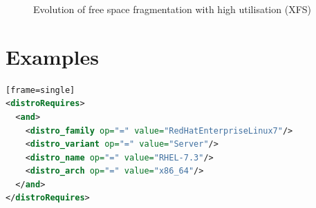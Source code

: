 \documentclass[
  color, %
  table, %
  lof,   %
  lot,   %
]{fithesis3}
\begin{document}
\begin{figure}[htb]
    \centering
    \caption{Evolution of free space fragmentation with high utilisation (XFS)}
    \label{fig:free99}
\end{figure}




\chapter{Examples}
\label{examples}


\begin{lstlisting}[language=xml, caption={Specifying OS to be installed}, label={ex:os}][frame=single]
<distroRequires>
  <and>
    <distro_family op="=" value="RedHatEnterpriseLinux7"/>
    <distro_variant op="=" value="Server"/>
    <distro_name op="=" value="RHEL-7.3"/>
    <distro_arch op="=" value="x86_64"/>
  </and>
</distroRequires>
\end{lstlisting}
\end{document}
